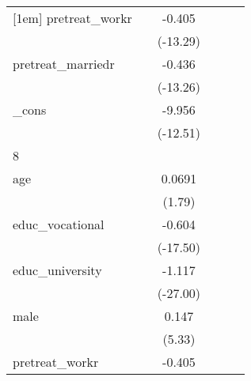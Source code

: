 {\begin{tabular}{l*{5}{c}}
[1em]
pretreat\_workr&                     &      -0.405\sym{***}&                     &                     &                     \\
            &                     &    (-13.29)         &                     &                     &                     \\
[1em]
pretreat\_marriedr&                     &      -0.436\sym{***}&                     &                     &                     \\
            &                     &    (-13.26)         &                     &                     &                     \\
[1em]
\_cons      &                     &      -9.956\sym{***}&                     &                     &                     \\
            &                     &    (-12.51)         &                     &                     &                     \\
\hline
8           &                     &                     &                     &                     &                     \\
age         &                     &      0.0691         &                     &                     &                     \\
            &                     &      (1.79)         &                     &                     &                     \\
[1em]
educ\_vocational&                     &      -0.604\sym{***}&                     &                     &                     \\
            &                     &    (-17.50)         &                     &                     &                     \\
[1em]
educ\_university&                     &      -1.117\sym{***}&                     &                     &                     \\
            &                     &    (-27.00)         &                     &                     &                     \\
[1em]
male        &                     &       0.147\sym{***}&                     &                     &                     \\
            &                     &      (5.33)         &                     &                     &                     \\
[1em]
pretreat\_workr&                     &      -0.405\sym{***}&                     &                     &                     \\

\end{tabular}}
